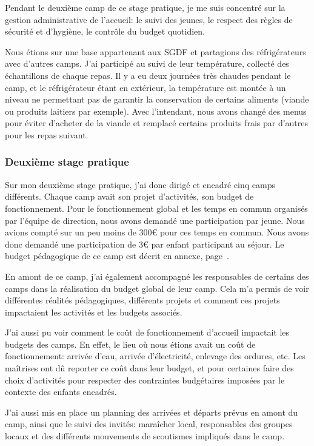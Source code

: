 \documentclass[titlepage,11pt,a4paper]{article}
\begin{document}
Pendant le deuxième camp de ce stage pratique, je me suis concentré sur la gestion
administrative de l'accueil: le suivi des jeunes, le respect des règles de sécurité et
d'hygiène, le contrôle du budget quotidien.

Nous étions sur une base appartenant aux SGDF et partagions des réfrigérateurs avec
d'autres camps. J'ai participé au suivi de leur température, collecté des échantillons de
chaque repas. Il y a eu deux journées très chaudes pendant le camp, et le réfrigérateur
étant en extérieur, la température est montée à un niveau ne permettant pas de garantir la
conservation de certains aliments (viande ou produits laitiers par exemple). Avec
l'intendant, nous avons changé des menus pour éviter d'acheter de la viande et remplacé
certains produits frais par d'autres pour les repas suivant.

\subsubsection{Deuxième stage pratique}


Sur mon deuxième stage pratique, j'ai donc dirigé et encadré cinq camps différents. Chaque camp avait son
projet d'activités, son budget de fonctionnement. Pour le fonctionnement global et les
temps en commun organisés par l'équipe de direction, nous avons demandé une participation
par jeune. Nous avions compté sur un peu moins de 300€ pour ces temps en commun. Nous
avons donc demandé une participation de 3€ par enfant participant au séjour. Le budget
pédagogique de ce camp est décrit en annexe, page~\pageref{budgped}.

En amont de ce camp, j'ai également accompagné les responsables de certains des camps dans
la réalisation du budget global de leur camp. Cela m'a permis de voir différentes
réalités pédagogiques, différents projets et comment ces projets impactaient les activités
et les budgets associés.

J'ai aussi pu voir comment le coût de fonctionnement d'accueil
impactait les budgets des camps. En effet, le lieu où nous étions avait un coût de
fonctionnement: arrivée d'eau, arrivée d'électricité, enlevage des ordures, etc. Les
maîtrises ont dû reporter ce coût dans leur budget, et pour certaines faire des choix
d'activités pour respecter des contraintes budgétaires imposées par le contexte des
enfants encadrés.

J'ai aussi mis en place un planning des arrivées et départs prévus en amont du camp, ainsi
que le suivi des invités: maraîcher local, responsables des groupes locaux et des
différents mouvements de scoutismes impliqués dans le camp.
\end{document}
